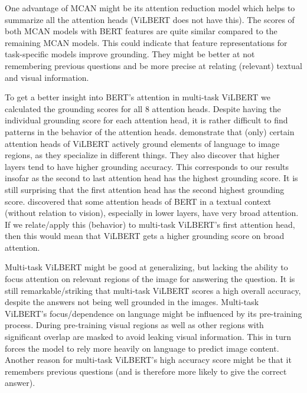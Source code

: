 \documentclass{article}
\begin{document}
One advantage of MCAN might be its attention reduction model which helps to summarize all the attention heads (ViLBERT does not have this). The scores of both MCAN models with BERT features are quite similar compared to the remaining MCAN models. This could indicate that feature representations for task-specific models improve grounding. They might be better at not remembering previous questions and be more precise at relating (relevant) textual and visual information.  

To get a better insight into BERT’s attention in multi-task ViLBERT we calculated the grounding scores for all 8 attention heads. Despite having the individual grounding score for each attention head, it is rather difficult to find patterns in the behavior of the attention heads. \cite{li2020bert} demonstrate that (only) certain attention heads of ViLBERT actively ground elements of language to image regions, as they specialize in different things. They also discover that higher layers tend to have higher grounding accuracy. This corresponds to our results insofar as the second to last attention head has the highest grounding score. It is still surprising that the first attention head has the second highest grounding score. \cite{clark2019bert} discovered that some attention heads of BERT in a textual context (without relation to vision), especially in lower layers, have very broad attention. If we relate/apply this (behavior) to multi-task ViLBERT's first attention head, then this would mean that ViLBERT gets a higher grounding score on broad attention. %

Multi-task ViLBERT might be good at generalizing, but lacking the ability to focus attention on relevant regions of the image for answering the question. It is still remarkable/striking that multi-task ViLBERT scores a high overall accuracy, despite the answers not being well grounded in the images. Multi-task ViLBERT's focus/dependence on language might be influenced by its pre-training process. During pre-training visual regions as well as other regions with significant overlap are masked to avoid leaking visual information. This in turn forces the model to rely more heavily on language to predict image content. Another reason for multi-task ViLBERT's high accuracy score might be that it remembers previous questions (and is therefore more likely to give the correct answer).
\end{document}
